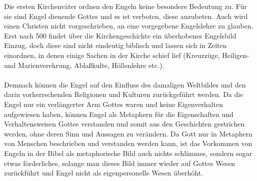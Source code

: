 Die ersten Kirchenväter ordnen den Engeln keine besondere Bedeutung zu. Für sie sind Engel dienende Gottes und es ist verboten, diese anzubeten. Auch wird einen Christen nicht vorgeschrieben, an eine vorgegebene Engelslehre zu glauben. Erst nach 500 findet über die Kirchengeschichte ein überhobenes Engelsbild Einzug, doch diese sind nicht eindeutig biblisch und lassen sich in Zeiten einordnen, in denen einige Sachen in der Kirche schief lief
 (Kreuzzüge, Heiligen- und Marienverehrung, Ablaßkulte, Höllenlehre etc.).
\\~\\
Demnach können die Engel auf den Einfluss des damaligen Weltbildes und den darin vorherrschenden Religionen und Kulturen zurückgeführt werden. Da die Engel nur ein verlängerter Arm Gottes waren und keine Eigenverhalten aufgewiesen haben, können Engel als Metaphern für die Eigenschaften und Verhaltensweisen Gottes verstanden und somit aus den Geschichten gestrichen werden, ohne deren Sinn und Aussagen zu verändern. Da Gott nur in Metaphern
von Menschen beschrieben und verstanden werden kann, ist das Vorkommen von Engeln in der Bibel als metaphorische Bild auch nichts schlimmes, sondern sogar etwas förderliches, solange man dieses Bild immer wieder auf Gottes Wesen zurückführt und Engel nicht als eigenpersonelle Wesen überhöht.

